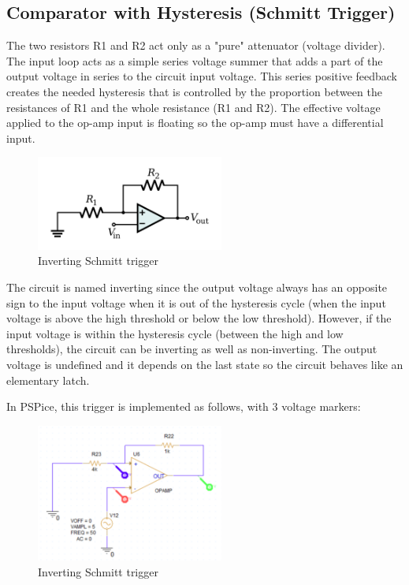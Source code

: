 \subsection{Comparator with Hysteresis (Schmitt Trigger)}

The two resistors R1 and R2 act only as a "pure" attenuator (voltage divider). The input
loop acts as a simple series voltage summer that adds a part of the output voltage in series
to the circuit input voltage. This series positive feedback creates the needed hysteresis
that is controlled by the proportion between the resistances of R1 and the whole resistance (R1 and R2). The effective voltage applied to the op-amp input is floating so the op-amp must have a differential input.

\begin{figure}[ht]
    \centering
    \includegraphics[width=0.55\textwidth]{graphics/ex1/f23.png}
    \caption{Inverting Schmitt trigger}
\end{figure}

The circuit is named inverting since the output voltage always has an opposite sign to the
input voltage when it is out of the hysteresis cycle (when the input voltage is above the
high threshold or below the low threshold). However, if the input voltage is within the
hysteresis cycle (between the high and low thresholds), the circuit can be inverting as well
as non-inverting. The output voltage is undefined and it depends on the last state so the
circuit behaves like an elementary latch.

In PSPice, this trigger is implemented as follows, with 3 voltage markers:

\begin{figure}[ht]
    \centering
    \includegraphics[width=0.55\textwidth]{graphics/ex1/f24.png}
    \caption{Inverting Schmitt trigger}
\end{figure}

